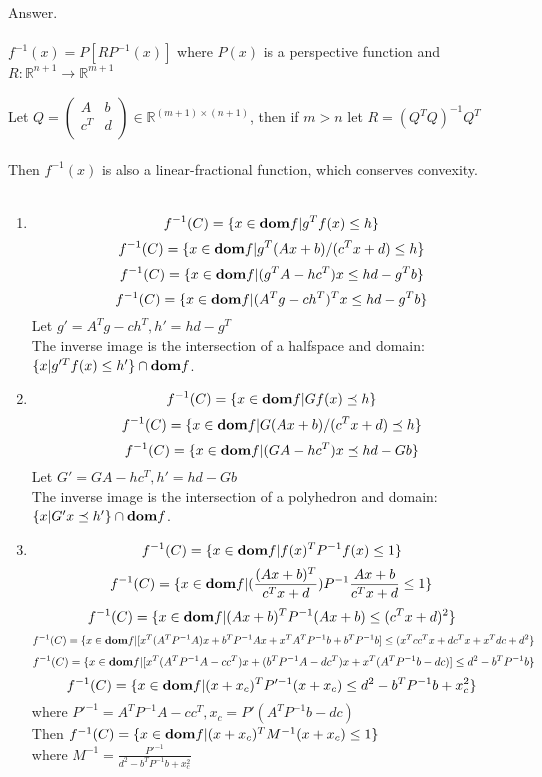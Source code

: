 \documentclass{article}
\newcommand{\reals}{{\mathbb{R}}}
\newcommand{\dom}{{\bf{dom}}}
\theoremstyle{definition}
\theoremstyle{definition}
\theoremstyle{remark}
\begin{document}
\bf{Answer.
\\\\
$f^{-1}(x)=P[RP^{-1}(x)]$ where $P(x)$ is a perspective function and $R:\reals^{n+1} \rightarrow \reals^{m+1}$
\\\\Let $Q=   \left(
                \begin{array}{cc}
                    A & b\\
                    c^T & d\\ 
                \end{array}
            \right)\in\reals^{(m+1)\times(n+1)}$, then if $m>n$ let $R=(Q^TQ)^{-1}Q^T$
\\\\Then $f^{-1}(x)$ is also a linear-fractional function, which conserves convexity.
\\\\ \begin{enumerate}
    \item $$f^{-1}(C)=\{x\in\dom f|g^T f(x)\leq h\}$$
    $$f^{-1}(C)=\{x\in\dom f|g^T(Ax+b)/(c^T x+d)\leq h\}$$ 
    $$f^{-1}(C)=\{x\in\dom f|(g^T A-hc^T)x\leq hd-g^T b\}$$ 
    $$f^{-1}(C)=\{x\in\dom f|(A^Tg-ch^T)^Tx\leq hd-g^T b\}$$ 
    Let $g'=A^Tg-ch^T,h'=hd-g^T$
    \\The inverse image is the intersection of a halfspace and domain: $\{x|g'^Tf(x)\leq h'\}\cap\dom f$.
    \item $$f^{-1}(C)=\{x\in\dom f|Gf(x)\preceq h\}$$
    $$f^{-1}(C)=\{x\in\dom f|G(Ax+b)/(c^T x+d)\preceq h\}$$
    $$f^{-1}(C)=\{x\in\dom f|(GA-hc^T)x\preceq hd-Gb\}$$
    Let $G'=GA-hc^T,h'=hd-Gb$
    \\The inverse image is the intersection of a polyhedron and domain: $\{x|G'x\preceq h'\}\cap\dom f$.
    \item $$f^{-1}(C)=\{x\in\dom f|f(x)^T P^{-1}f(x)\leq1\}$$
    $$f^{-1}(C)=\{x\in\dom f|(\frac{(Ax+b)^T}{c^T x+d}) P^{-1}\frac{Ax+b}{c^T x+d}\leq1\}$$
    $$f^{-1}(C)=\{x\in\dom f|(Ax+b)^T P^{-1}(Ax+b)\leq(c^T x+d)^2\}$$
    $$f^{-1}(C)=\{x\in\dom f|[x^T(A^T P^{-1}A)x+b^TP^{-1}Ax+x^TA^T P^{-1}b+b^TP^{-1}b]\leq(x^Tcc^Tx+dc^Tx+x^Tdc+d^2\}$$
    $$f^{-1}(C)=\{x\in\dom f|[x^T(A^T P^{-1}A-cc^T)x+(b^TP^{-1}A-dc^T)x+x^T(A^T P^{-1}b-dc)]\leq d^2-b^T P^{-1}b\}$$
    $$f^{-1}(C)=\{x\in\dom f|(x+x_c)^TP'^{-1}(x+x_c)\leq d^2-b^T P^{-1}b+x_c^2\}$$
    where $P'^{-1}=A^T P^{-1}A-cc^T,x_c=P'(A^T P^{-1}b-dc)$
    \\Then $f^{-1}(C)=\{x\in\dom f|(x+x_c)^TM^{-1}(x+x_c)\leq 1\}$
    \\where $M^{-1}=\frac{P'^{-1}}{d^2-b^T P^{-1}b+x_c^2}$

\end{enumerate}}
\end{document}
